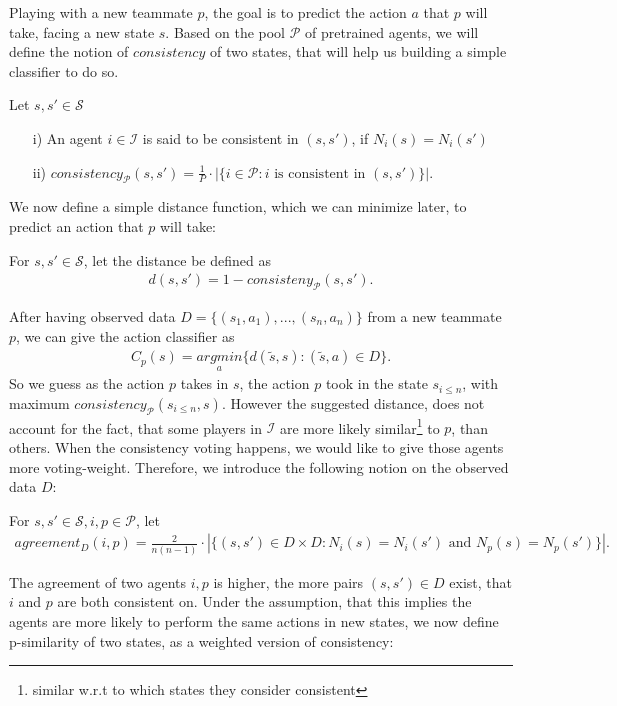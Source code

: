 \documentclass[a4paper, 11pt]{article}
\begin{document}
	
	Playing with a new teammate $p$, the goal is to predict the action $a$ that $p$ will take, facing a new state $s$. Based on the pool $\mathcal{P}$ of pretrained agents, we will define the notion of $consistency$ of two states, that will help us building a simple classifier to do so.
	\begin{Def}[consistency] {Let $s,s'\in\mathcal{S}$ }
		\begin{itemize}
			\item[i)] An agent $i\in\mathcal{I}$ is said to be consistent in $(s,s')$, if $N_i(s) = N_i(s')$
			\item[ii)] $consistency_{\mathcal{P}}(s,s') = \frac{1}{P}\cdot|\{ i \in\mathcal{P}: i \text{ is consistent in } (s,s') \}|$.
		\end{itemize}		
	\end{Def}
 	We now define a simple distance function, which we can minimize later, to predict an action that $p$ will take:
	\begin{Def}[Distance] {For $s,s'\in\mathcal{S}$, let  the distance be defined as}
	\begin{align*}
	d(s, s') = 1 - consisteny_{\mathcal{P}}(s,s').
	\end{align*}
	\end{Def}
	After having observed data $D = \{(s_1, a_1),...,(s_n,a_n)\}$ from a new teammate $p$, we can give the action classifier as 
	\begin{align*}
	C_p(s) = \underset{a}{argmin} \{ d(\tilde{s}, s): (\tilde{s}, a)\in D \}.
	\end{align*}
	So we guess as the action $p$ takes in $s$, the action $p$ took in the state $s_{i\leq n}$,  with maximum $consistency_{\mathcal{P}}(s_{i\leq n}, s)$. However the suggested distance, does not account for the fact, that some players in $\mathcal{I}$ are more likely similar\footnote{similar w.r.t to which states they consider consistent} to $p$, than others. When the consistency voting happens, we would like to give those agents more voting-weight. Therefore, we introduce the following notion on the observed data $D$:
	\begin{Def}[agreement] {For $s,s'\in\mathcal{S}, i,p\in\mathcal{P}$, let  }
		\begin{align*}
		agreement_D(i,p) =  \frac{2}{n(n-1)}\cdot|\{ (s,s')\in D\times D: N_i(s) = N_i(s') \text{ and } N_p(s) = N_p(s')\}|.
		\end{align*}
	\end{Def}
	The agreement of two agents $i,p$ is higher, the more pairs $(s,s')\in D$ exist, that $i$ and $p$ are both consistent on. Under the assumption, that this implies the agents are more likely to perform the same actions in new states, we now define p-similarity of two states, as a weighted version of consistency:
	
\end{document}
